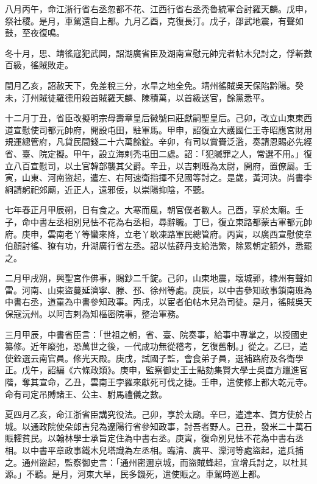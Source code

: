 \begin{pinyinscope}
 八月丙午，命江浙行省右丞忽都不花、江西行省右丞禿魯統軍合討羅天麟。戊申，祭社稷。是月，車駕還自上都。九月乙酉，克復長汀。戊子，邵武地震，有聲如鼓，至夜復鳴。



 冬十月，思、靖徭寇犯武岡，詔湖廣省臣及湖南宣慰元帥完者帖木兒討之，俘斬數百級，徭賊敗走。



 閏月乙亥，詔赦天下，免差稅三分，水旱之地全免。靖州徭賊吳天保陷黔陽。癸未，汀州賊徒羅德用殺首賊羅天麟、陳積萬，以首級送官，餘黨悉平。



 十二月丁丑，省臣改擬明宗母壽章皇后徽號曰莊獻嗣聖皇后。己卯，改立山東東西道宣慰使司都元帥府，開設屯田，駐軍馬。甲申，詔復立大護國仁王寺昭應宮財用規運總管府，凡貸民間錢二十六萬餘錠。辛卯，有司以賞賚泛濫，奏請恩賜必先經省、臺、院定擬。甲午，設立海剌禿屯田二處。詔：「犯贓罪之人，常選不用。」復立八百宣慰司，以土官韓部襲其父爵。辛丑，以吉剌班為太尉，開府，置僚屬。壬寅，山東、河南盜起，遣左、右阿速衛指揮不兒國等討之。是歲，黃河決。尚書李絅請躬祀郊廟，近正人，遠邪佞，以崇陽抑陰，不聽。



 七年春正月甲辰朔，日有食之。大寒而風，朝官僕者數人。己酉，享於太廟。壬子，命中書左丞相別兒怯不花為右丞相，尋辭職。丁巳，復立東路都蒙古軍都元帥府。庚申，雲南老丫等蠻來降，立老丫耿凍路軍民總管府。丙寅，以廣西宣慰使章伯顏討徭、獠有功，升湖廣行省左丞。詔以怯薛丹支給浩繁，除累朝定額外，悉罷之。



 二月甲戌朔，興聖宮作佛事，賜鈔二千錠。己卯，山東地震，壞城郭，棣州有聲如雷。河南、山東盜蔓延濟寧、滕、邳、徐州等處。庚辰，以中書參知政事鎖南班為中書右丞，道童為中書參知政事。丙戌，以宦者伯帖木兒為司徒。是月，徭賊吳天保寇沅州。以阿吉剌為知樞密院事，整治軍務。



 三月甲辰，中書省臣言：「世祖之朝，省、臺、院奏事，給事中專掌之，以授國史纂修。近年廢弛，恐萬世之後，一代成功無從稽考，乞復舊制。」從之。乙巳，遣使銓選云南官員。修光天殿。庚戌，試國子監，會食弟子員，選補路府及各衛學正。戊午，詔編《六條政類》。庚申，監察御史王士點劾集賢大學士吳直方躐進官階，奪其宣命，乙丑，雲南王孛羅來獻死可伐之捷。壬申，遣使修上都大乾元寺。命有司定吊賻諸王、公主、駙馬禮儀之數。



 夏四月乙亥，命江浙省臣講究役法。己卯，享於太廟。辛巳，遣達本、賀方使於占城。以通政院使朵郎吉兒為遼陽行省參知政事，討吾者野人。己丑，發米二十萬石賑糶貧民。以翰林學士承旨定住為中書右丞。庚寅，復命別兒怯不花為中書右丞相。以中書平章政事鐵木兒塔識為左丞相。臨清、廣平、灤河等處盜起，遣兵捕之。通州盜起，監察御史言：「通州密邇京城，而盜賊蜂起，宜增兵討之，以杜其源。」不聽。是月，河東大旱，民多饑死，遣使賑之。車駕時巡上都。




\end{pinyinscope}
